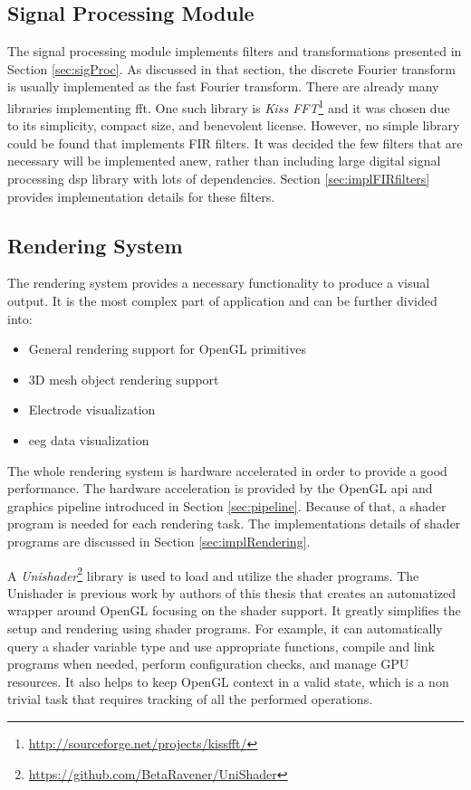 \subsection{Signal Processing Module}
The signal processing module implements filters and transformations presented in Section \ref{sec:sigProc}. As discussed in that section, the discrete Fourier transform is usually implemented as the fast Fourier transform. There are already many libraries implementing \gls{fft}. One such library is \emph{Kiss FFT}\footnote{\url{http://sourceforge.net/projects/kissfft/}} and it was chosen due to its simplicity, compact size, and benevolent license. However, no simple library could be found that implements FIR filters. It was decided the few filters that are necessary will be implemented anew, rather than including large digital signal processing \gls{dsp} library with lots of dependencies. Section \ref{sec:implFIRfilters} provides implementation details for these filters.

\subsection{Rendering System}
The rendering system provides a necessary functionality to produce a visual output. It is the most complex part of application and can be further divided into:
\begin{itemize}
	\item General rendering support for OpenGL primitives
	\item 3D mesh object rendering support
	\item Electrode visualization
	\item \gls{eeg} data visualization
\end{itemize}

The whole rendering system is hardware accelerated in order to provide a good performance. The hardware acceleration is provided by the OpenGL \gls{api} and graphics pipeline introduced in Section \ref{sec:pipeline}. Because of that, a shader program is needed for each rendering task. The implementations details of shader programs are discussed in Section \ref{sec:implRendering}. 

A \emph{Unishader}\footnote{\url{https://github.com/BetaRavener/UniShader}} library is used to load and utilize the shader programs. The Unishader is previous work by authors of this thesis that creates an automatized wrapper around OpenGL focusing on the shader support. It greatly simplifies the setup and rendering using shader programs. For example, it can automatically query a shader variable type and use appropriate functions, compile and link programs when needed, perform configuration checks, and manage GPU resources. It also helps to keep OpenGL context in a valid state, which is a non trivial task that requires tracking of all the performed operations.

